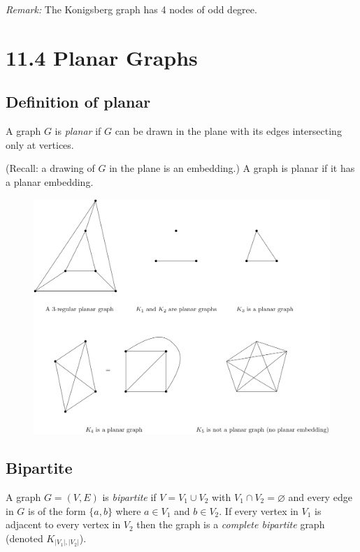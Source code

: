 \documentclass[11pt]{article}
\let\emptyset\varnothing
\begin{document}
    \emph{Remark:} The Konigsberg graph has 4 nodes of odd degree.

    \pagebreak

    \section{11.4 Planar Graphs}

    \subsection{Definition of planar}

    A graph $G$ is \emph{planar} if $G$ can be drawn in the plane with its edges intersecting only at vertices.

    (Recall: a drawing of $G$ in the plane is an embedding.) A graph is planar if it has a planar embedding.
    \begin{figure}[H]
        \centering
        \includegraphics[scale=0.3]{planar.png}
    \end{figure}

    \subsection{Bipartite}

    A graph \(G = (V,E)\) is \emph{bipartite} if \(V = V_1 \cup V_2\) with \(V_1 \cap V_2 = \emptyset\) and every edge in $G$ is of the form \(\{a,b\}\) where \(a \in V_1\) and \(b \in V_2\). If every vertex in \(V_1\) is adjacent to every vertex in \(V_2\) then the graph is a \emph{complete bipartite} graph (denoted \(K_{|V_1|,|V_2|}\)).
\end{document}
